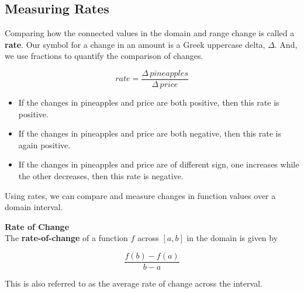 \documentclass{ximera}
\begin{document}
\subsection*{Measuring Rates}

Comparing how the connected values in the domain and range change is called a \textbf{rate}. Our symbol for a change in an amount is a Greek uppercase delta, $\Delta$.  And, we use fractions to quantify the comparison of changes.

\[ rate = \frac{\Delta \, pineapples}{\Delta \, price}\]




\begin{itemize}
\item If the changes in pineapples and price are both positive, then this rate is positive.
\item If the changes in pineapples and price are both negative, then this rate is again positive.
\item If the changes in pineapples and price are of different sign, one increases while the other decreases, then this rate is negative.
\end{itemize}


Using rates, we can compare and measure changes in function values over a domain interval.


\begin{definition}  \textbf{\textcolor{green!50!black}{Rate of Change}} \\
The \textbf{rate-of-change} of a function $f$ across $[a, b]$ in the domain is given by

\[  \frac{f(b) - f(a)}{b - a}  \]



This is also referred to as the average rate of change across the interval.

\end{definition}
\end{document}
